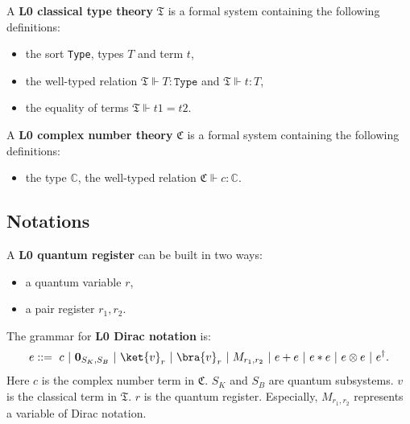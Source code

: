 \begin{definition}
  A \textbf{L0 classical type theory} $\mathfrak{T}$ is a formal system containing the following definitions:
  \begin{itemize}
    \item the sort \texttt{Type}, types $T$ and term $t$,
    \item the well-typed relation $\mathfrak{T} \Vdash T : \texttt{Type}$ and $\mathfrak{T} \Vdash t : T$,
    \item the equality of terms $\mathfrak{T} \Vdash t1 = t2$.
  \end{itemize}
\end{definition}

\begin{definition}
  A \textbf{L0 complex number theory} $\mathfrak{C}$ is a formal system containing the following definitions:
  \begin{itemize}
    \item the type $\mathbb{C}$, the well-typed relation $\mathfrak{C} \Vdash c : \mathbb{C}$.
  \end{itemize}
\end{definition}

\subsection{Notations}

\begin{definition}
  A \textbf{L0 quantum register} can be built in two ways:
  \begin{itemize}
    \item a quantum variable $r$,
    \item a pair register $r_1, r_2$.
  \end{itemize}
\end{definition}

\begin{definition}
  The grammar for \textbf{L0 Dirac notation} is:
  $$
  e ::=\ c\ |\ \textbf{0}_{S_K, S_B}\ |\ \ket{v}_r\ |\ \bra{v}_r\ |\ M_{r_1, r_2}\ |\ e + e\ |\ e * e\ |\ e \otimes e\ |\ e^\dagger.
  $$
  Here $c$ is the complex number term in $\mathfrak{C}$. $S_K$ and $S_B$ are quantum subsystems. $v$ is the classical term in $\mathfrak{T}$. $r$ is the quantum register. Especially, $M_{r_1, r_2}$ represents a variable of Dirac notation.
\end{definition}

